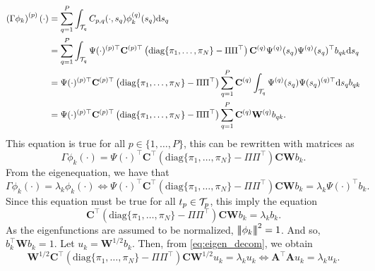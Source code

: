 \begin{align*}
    \left(\Gamma \phi_k\right)^{(p)}(\cdot) &= \sum_{q = 1}^P \int_{\mathcal{T}_{q}} C_{p, q}(\cdot, s_q)\phi_k^{(q)}(s_q) {\rm d} s_q \\
    &= \sum_{q = 1}^P \int_{\mathcal{T}_{q}} \Psi(\cdot)^{(p) \top} \mathbf{C}^{(p) \top} \left(\text{diag}\{\pi_1, \dots, \pi_N\} - \Pi\Pi^\top\right)\mathbf{C}^{(q)} \Psi^{(q)}(s_q) \Psi^{(q)}(s_q)^\top b_{q k} {\rm d} s_q \\
    &= \Psi(\cdot)^{(p) \top} \mathbf{C}^{(p) \top} \left(\text{diag}\{\pi_1, \dots, \pi_N\} - \Pi\Pi^\top\right)\sum_{q = 1}^P \mathbf{C}^{(q)} \int_{\mathcal{T}_{q}} \Psi^{(q)}(s_q) \Psi(s_q)^{(q) \top} {\rm d} s_q b_{q k} \\
    &= \Psi(\cdot)^{(p) \top} \mathbf{C}^{(p) \top} \left(\text{diag}\{\pi_1, \dots, \pi_N\} - \Pi\Pi^\top\right) \sum_{q = 1}^P \mathbf{C}^{(q)} \mathbf{W}^{(q)} b_{q k}. \\
\end{align*}
This equation is true for all $p \in \{1, \dots, P\}$, this can be rewritten with matrices as
\begin{equation}
    \Gamma \phi_k(\cdot) = \Psi(\cdot)^{\top} \mathbf{C}^{\top} \left(\text{diag}\{\pi_1, \dots, \pi_N\} - \Pi\Pi^\top\right) \mathbf{C} \mathbf{W} b_{k}.
\end{equation}
From the eigenequation, we have that
\begin{equation}
    \Gamma \phi_k(\cdot) = \lambda_k \phi_k(\cdot) \Longleftrightarrow \Psi(\cdot)^{\top} \mathbf{C}^{\top} \left(\text{diag}\{\pi_1, \dots, \pi_N\} - \Pi\Pi^\top\right) \mathbf{C} \mathbf{W} b_{k} = \lambda_k \Psi(\cdot)^\top b_k.
\end{equation}
Since this equation must be true for all $t_p \in \mathcal{T}_{p}$, this imply the equation
\begin{equation}\label{eq:eigen_decom}
    \mathbf{C}^{\top} \left(\text{diag}\{\pi_1, \dots, \pi_N\} - \Pi\Pi^\top\right) \mathbf{C} \mathbf{W} b_{k} = \lambda_k b_k.
\end{equation}
As the eigenfunctions are assumed to be normalized, $\left|\!\left|\!\left|\phi_k\right|\!\right|\!\right|^2 = 1$. And so, $b_k^\top \mathbf{W} b_k = 1$. Let $u_k = \mathbf{W}^{1/2}b_k$. Then, from \eqref{eq:eigen_decom}, we obtain
\begin{equation}\label{eq:eigen_cov_op}
    \mathbf{W}^{1/2} \mathbf{C}^{\top} \left(\text{diag}\{\pi_1, \dots, \pi_N\} - \Pi\Pi^\top\right) \mathbf{C} \mathbf{W}^{1/2} u_k = \lambda_k u_k \Longleftrightarrow \mathbf{A}^\top\mathbf{A} u_k = \lambda_k u_k.
\end{equation}
